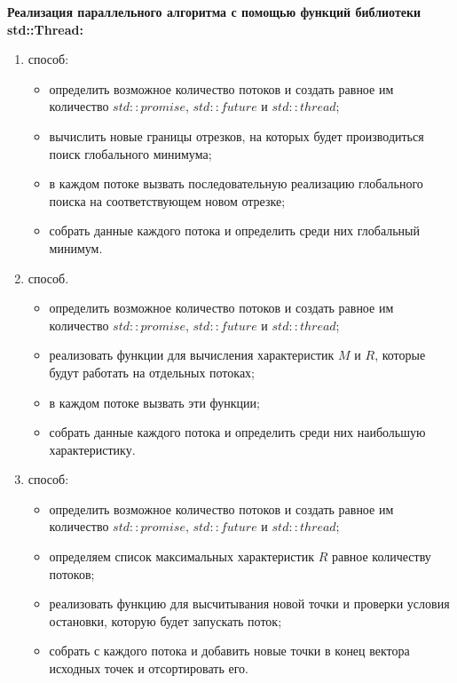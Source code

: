 \documentclass{report}
\begin{document}
\textbf{Реализация параллельного алгоритма с помощью функций библиотеки std::Thread:}
\begin{enumerate}
    \item способ:
        \begin{itemize}
            \item определить возможное количество потоков и создать равное им количество $std::promise$, $std::future$ и $std::thread$;
            \item вычислить новые границы отрезков, на которых будет производиться поиск глобального минимума;
            \item в каждом потоке вызвать последовательную реализацию глобального поиска на соответствующем новом отрезке;
            \item собрать данные каждого потока и определить среди них глобальный минимум.
        \end{itemize}
    \item способ. 
        \begin{itemize}
            \item определить возможное количество потоков и создать равное им количество $std::promise$, $std::future$ и $std::thread$;
            \item реализовать функции для вычисления характеристик $M$ и $R$, которые будут работать на отдельных потоках;
            \item в каждом потоке вызвать эти функции;
            \item собрать данные каждого потока и определить среди них наибольшую характеристику.
        \end{itemize}
    \item способ:
        \begin{itemize}
            \item определить возможное количество потоков и создать равное им количество $std::promise$, $std::future$ и $std::thread$;
            \item определяем список максимальных характеристик $R$ равное количеству потоков;
            \item реализовать функцию для высчитывания новой точки и проверки условия остановки, которую будет запускать поток;
            \item собрать с каждого потока и добавить новые точки в конец вектора исходных точек и отсортировать его.
        \end{itemize}
\end{enumerate}
\end{document}
